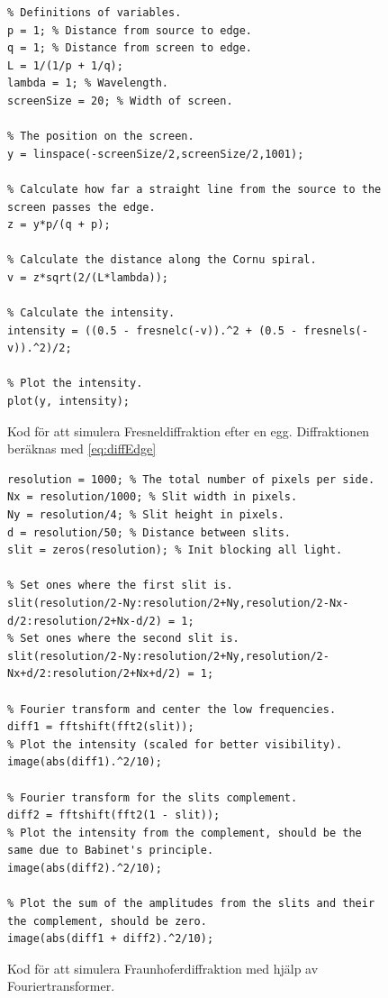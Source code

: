 \documentclass[a4paper]{article}
\begin{document}
\FloatBarrier

  \begin{figure}[ht]
  \centering
  \begin{lstlisting}
% Definitions of variables.
p = 1; % Distance from source to edge.
q = 1; % Distance from screen to edge.
L = 1/(1/p + 1/q);
lambda = 1; % Wavelength.
screenSize = 20; % Width of screen.

% The position on the screen.
y = linspace(-screenSize/2,screenSize/2,1001);

% Calculate how far a straight line from the source to the screen passes the edge.
z = y*p/(q + p);

% Calculate the distance along the Cornu spiral.
v = z*sqrt(2/(L*lambda));

% Calculate the intensity.
intensity = ((0.5 - fresnelc(-v)).^2 + (0.5 - fresnels(-v)).^2)/2;

% Plot the intensity.
plot(y, intensity);
  \end{lstlisting}
  \caption{Kod för att simulera Fresneldiffraktion efter en egg. Diffraktionen beräknas med \eqref{eq:diffEdge}}
  \end{figure}

  \begin{figure}[ht]
  \centering
  \begin{lstlisting}
resolution = 1000; % The total number of pixels per side.
Nx = resolution/1000; % Slit width in pixels.
Ny = resolution/4; % Slit height in pixels.
d = resolution/50; % Distance between slits.
slit = zeros(resolution); % Init blocking all light.

% Set ones where the first slit is.
slit(resolution/2-Ny:resolution/2+Ny,resolution/2-Nx-d/2:resolution/2+Nx-d/2) = 1;
% Set ones where the second slit is.
slit(resolution/2-Ny:resolution/2+Ny,resolution/2-Nx+d/2:resolution/2+Nx+d/2) = 1;

% Fourier transform and center the low frequencies.
diff1 = fftshift(fft2(slit));
% Plot the intensity (scaled for better visibility).
image(abs(diff1).^2/10);

% Fourier transform for the slits complement.
diff2 = fftshift(fft2(1 - slit));
% Plot the intensity from the complement, should be the same due to Babinet's principle.
image(abs(diff2).^2/10);

% Plot the sum of the amplitudes from the slits and their the complement, should be zero.
image(abs(diff1 + diff2).^2/10);
  \end{lstlisting}
  \caption{Kod för att simulera Fraunhoferdiffraktion med hjälp av Fouriertransformer.}
  \end{figure}
\end{document}
